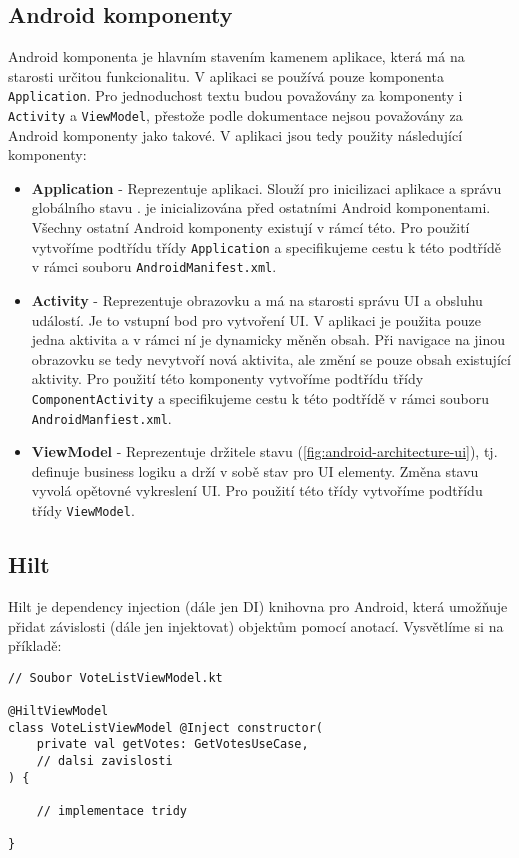 \subsection *{Android komponenty}
Android komponenta \cite{android-component-application} je hlavním stavením kamenem aplikace, která má na starosti určitou funkcionalitu. V aplikaci se používá pouze komponenta \lstinline|Application|. Pro jednoduchost textu budou považovány za komponenty i \lstinline|Activity| a \lstinline|ViewModel|, přestože podle dokumentace nejsou považovány za Android komponenty jako takové. V aplikaci jsou tedy použity následující komponenty:

\begin{itemize}
	\item \textbf{Application} - Reprezentuje aplikaci. Slouží pro inicilizaci aplikace a správu globálního stavu \cite{android-component-application}. je inicializována před ostatními Android komponentami. Všechny ostatní Android komponenty existují v rámcí této. Pro použití vytvoříme podtřídu třídy \lstinline|Application| a specifikujeme cestu k této podtřídě v rámci souboru \lstinline|AndroidManifest.xml|.
	
	\item \textbf{Activity} - Reprezentuje obrazovku a má na starosti správu UI a obsluhu událostí. Je to vstupní bod pro vytvoření UI. V aplikaci je použita pouze jedna aktivita a v rámci ní je dynamicky měněn obsah. Při navigace na jinou obrazovku se tedy nevytvoří nová aktivita, ale změní se pouze obsah existující aktivity. Pro použití této komponenty vytvoříme podtřídu třídy \lstinline|ComponentActivity| a specifikujeme cestu k této podtřídě v rámci souboru \lstinline|AndroidManfiest.xml|.
	
	\item \textbf{ViewModel} - Reprezentuje držitele stavu (\ref{fig:android-architecture-ui}), tj. definuje business logiku a drží v sobě stav pro UI elementy. Změna stavu vyvolá opětovné vykreslení UI. Pro použití této třídy vytvoříme podtřídu třídy \lstinline|ViewModel|.
\end{itemize}

\subsection *{Hilt}
Hilt je dependency injection (dále jen DI) knihovna pro Android, která umožňuje přidat závislosti (dále jen injektovat) objektům pomocí anotací. Vysvětlíme si na příkladě:

\begin{lstlisting}[caption={Příklad použití DI pomocí knihovny Hilt}, label={lst:hilt-di}, tabsize=2]
// Soubor VoteListViewModel.kt

@HiltViewModel
class VoteListViewModel @Inject constructor(
	private val getVotes: GetVotesUseCase,
	// dalsi zavislosti
) {
	
	// implementace tridy
	
}
\end{lstlisting}

